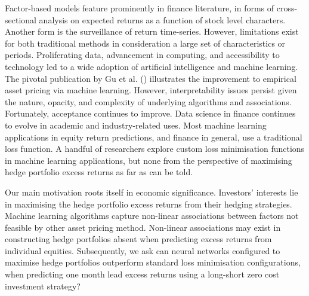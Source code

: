 Factor-based models feature prominently in finance literature, in forms of cross-sectional analysis on expected returns as a function of stock level characters.
Another form is the surveillance of return time-series.
However, limitations exist for both traditional methods in consideration a large set of characteristics or periods.
Proliferating data, advancement in computing, and accessibility to technology led to a wide adoption of artificial intelligence and machine learning.
The pivotal publication by Gu et al. (\citeyear{eapvml}) illustrates the improvement to empirical asset pricing via machine learning.
However, interpretability issues persist given the nature, opacity, and complexity of underlying algorithms and associations.
Fortunately, acceptance continues to improve.
Data science in finance continues to evolve in academic and industry-related uses.
Most machine learning applications in equity return predictions, and finance in general, use a traditional loss function.
A handful of researchers explore custom loss minimisation functions in machine learning applications, but none from the perspective of maximising hedge portfolio excess returns as far as can be told.

Our main motivation roots itself in economic significance.
Investors' interests lie in maximising the hedge portfolio excess returns from their hedging strategies.
Machine learning algorithms capture non-linear associations between factors not feasible by other asset pricing method.
Non-linear associations may exist in constructing hedge portfolios absent when predicting excess returns from individual equities.
Subsequently, we ask can neural networks configured to maximise hedge portfolios outperform standard loss minimisation configurations,
when predicting one month lead excess returns using a long-short zero cost investment strategy?

